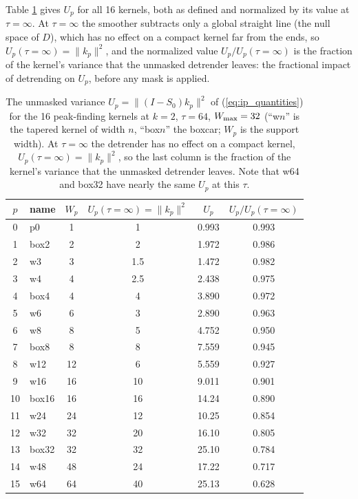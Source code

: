 \documentclass{article}
\numberwithin{equation}{section}   %
\begin{document}
Table \ref{tab:ip_Up} gives $U_p$ for all 16 kernels, both as defined and normalized by its value at
$\tau = \infty$.  At $\tau = \infty$ the smoother subtracts only a global straight line (the null space
of $D$), which has no effect on a compact kernel far from the ends, so $U_p(\tau{=}\infty) = \|k_p\|^2$,
and the normalized value $U_p/U_p(\tau{=}\infty)$ is the fraction of the kernel's variance that the
unmasked detrender leaves: the fractional impact of detrending on $U_p$, before any mask is applied.

\begin{table}[ht]
\centering\small
\begin{tabular}{c l c c c c}
\toprule
$p$ & name & $W_p$ & $U_p(\tau{=}\infty) = \|k_p\|^2$ & $U_p$ & $U_p/U_p(\tau{=}\infty)$ \\
\midrule
0 & p0 & 1 & 1 & 0.993 & 0.993 \\
1 & box2 & 2 & 2 & 1.972 & 0.986 \\
2 & w3 & 3 & 1.5 & 1.472 & 0.982 \\
3 & w4 & 4 & 2.5 & 2.438 & 0.975 \\
4 & box4 & 4 & 4 & 3.890 & 0.972 \\
5 & w6 & 6 & 3 & 2.890 & 0.963 \\
6 & w8 & 8 & 5 & 4.752 & 0.950 \\
7 & box8 & 8 & 8 & 7.559 & 0.945 \\
8 & w12 & 12 & 6 & 5.559 & 0.927 \\
9 & w16 & 16 & 10 & 9.011 & 0.901 \\
10 & box16 & 16 & 16 & 14.24 & 0.890 \\
11 & w24 & 24 & 12 & 10.25 & 0.854 \\
12 & w32 & 32 & 20 & 16.10 & 0.805 \\
13 & box32 & 32 & 32 & 25.10 & 0.784 \\
14 & w48 & 48 & 24 & 17.22 & 0.717 \\
15 & w64 & 64 & 40 & 25.13 & 0.628 \\
\bottomrule
\end{tabular}
\caption{The unmasked variance $U_p = \|(I - S_0)k_p\|^2$ of (\ref{eq:ip_quantities}) for the 16
peak-finding kernels at $k = 2$, $\tau = 64$, $W_{\rm max} = 32$ (``w$n$'' is the tapered kernel of
width $n$, ``box$n$'' the boxcar; $W_p$ is the support width).  At $\tau = \infty$ the detrender has no
effect on a compact kernel, $U_p(\tau{=}\infty) = \|k_p\|^2$, so the last column is the fraction of the
kernel's variance that the unmasked detrender leaves.  Note that w64 and box32 have nearly the same $U_p$ at this $\tau$.}
\label{tab:ip_Up}
\end{table}
\end{document}
